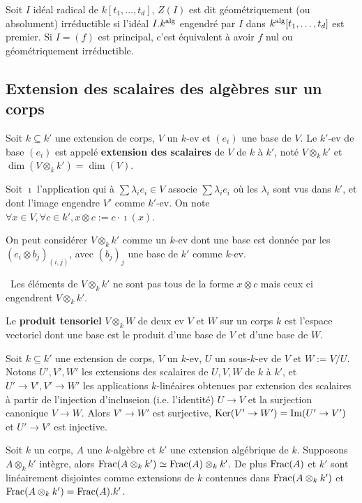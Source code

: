 	\begin{defn}
		Soit $I$ idéal radical de $k[t_1,\ldots,t_d]$, $Z(I)$ est dit géométriquement (ou absolument) irréductible si l'idéal $I.k^{\operatorname{alg}}$ engendré par $I$ dans $k^{\operatorname{alg}}[t_1,\ldots,t_d]$ est premier.
		Si $I = (f)$ est principal, c'est équivalent à avoir $f$ nul ou géométriquement irréductible.
	\end{defn}


\subsection{Extension des scalaires des algèbres sur un corps}

	\begin{defn}
		Soit $k \subseteq k'$ une extension de corps, $V$ un $k$-ev et $(e_i)$ une base de $V$.
		Le $k'$-ev de base $(e_i)$ est appelé \textbf{extension des scalaires} de $V$ de $k$ à $k'$, noté $V \otimes_k k'$ et $\dim(V \otimes_k k') = \dim(V)$.
	\end{defn}
	
	\begin{note}
		Soit $\imath$ l'application qui à $\sum \lambda_i e_i \in V$ associe $\sum \lambda_i e_i$ où les $\lambda_i$ sont vus dans $k'$, et dont l'image engendre $V'$ comme $k'$-ev.
		On note $\forall x \in V, \forall c \in k', x \otimes c := c \cdot \imath(x)$.
	\end{note}
	
	On peut considérer $V \otimes_k k'$ comme un $k$-ev dont une base est donnée par les $(e_i \otimes b_j)_{(i,j)}$, avec $(b_j)_j$ une base de $k'$ comme $k$-ev.
	
	\lightning\ Les éléments de $V \otimes _k k'$ ne sont pas tous de la forme $x \otimes c$ mais ceux ci engendrent $V \otimes _k k'$.
	
	\begin{defn}
		Le \textbf{produit tensoriel} $V \otimes_k W$ de deux ev $V$ et $W$ sur un corps $k$ est l'espace vectoriel dont une base est le produit d'une base de $V$ et d'une base de $W$.
	\end{defn}
	
	\begin{pop}
		Soit $k \subseteq k'$ une extension de corps, $V$ un $k$-ev, $U$ un sous-$k$-ev de $V$ et $W := V/U$.
		Notons $U',V',W'$ les extensions des scalaires de $U,V,W$ de $k$ à $k'$, et $U' \to V', V' \to W'$ les applications $k$-linéaires obtenues par extension des scalaires à partir de l'injection d'incluseion (i.e. l'identité) $U \to V$ et la surjection canonique $V \to W$.
		Alors $V' \to W'$ est surjective, $\operatorname{Ker}(V' \to W') = \operatorname{Im}(U' \to V')$ et $U' \to V'$ est injective.
	\end{pop}
	
	\begin{pop}
		Soit $k$ un corps, $A$ une $k$-algèbre et $k'$ une extension algébrique de $k$.
		Supposons $A \otimes_k k'$ intègre, alors $\operatorname{Frac}(A \otimes_k k') \simeq \operatorname{Frac}(A) \otimes_k k'$.
		De plus $\operatorname{Frac}(A)$ et $k'$ sont linéairement disjointes comme extensions de $k$ contenues dans $\operatorname{Frac}(A \otimes_k k')$ et $\operatorname{Frac}(A \otimes_k k') = \operatorname{Frac}(A).k'$.
	\end{pop}